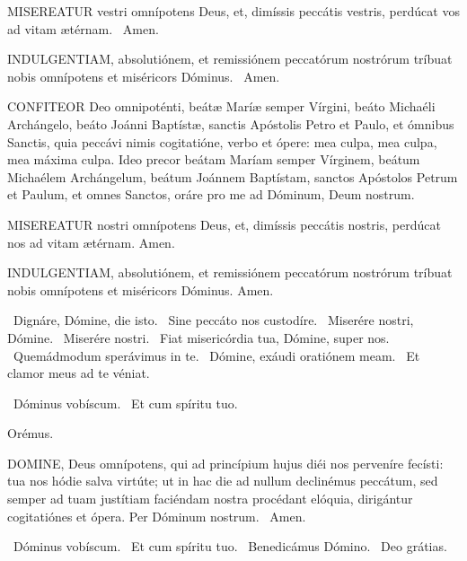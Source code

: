
\lettrine[lines=2]{M}{ISEREATUR} vestri omnípotens Deus, et, dimíssis peccátis vestris, perdúcat vos ad vitam ætérnam. \R\ Amen.

\lettrine[lines=2]{I}{NDULGENTIAM}, absolutiónem, et remissiónem peccatórum nostrórum tríbuat nobis omnípotens et miséricors Dóminus. \R\ Amen.


\lettrine[lines=2]{C}{ONFITEOR} Deo omnipoténti, beátæ Maríæ semper Vírgini, beáto Michaéli Archángelo, beáto Joánni Baptístæ, sanctis Apóstolis Petro et Paulo, et ómnibus Sanctis, quia peccávi nimis cogitatióne, verbo et ópere: mea culpa, mea culpa, mea máxima culpa. Ideo precor beátam Maríam semper Vírginem, beátum Michaélem Archángelum, beátum Joánnem Baptístam, sanctos Apóstolos Petrum et Paulum, et omnes Sanctos, oráre pro me ad Dóminum, Deum nostrum.


\lettrine[lines=2]{M}{ISEREATUR} nostri omnípotens Deus, et, dimíssis peccátis nostris, perdúcat nos ad vitam ætérnam. Amen.

\lettrine[lines=2]{I}{NDULGENTIAM}, absolutiónem, et remissiónem peccatórum nostrórum tríbuat nobis omnípotens et miséricors Dóminus. Amen.


\V\ Dignáre, Dómine, die isto. \R\ Sine peccáto nos custodíre. \V\ Miserére nostri, Dómine. \R\ Miserére nostri. \V\ Fiat misericórdia tua, Dómine, super nos. \R\ Quemádmodum sperávimus in te. \V\ Dómine, exáudi oratiónem meam. \R\ Et clamor meus ad te véniat.


\V\ Dóminus vobíscum. \R\ Et cum spíritu tuo.

Orémus. 

\lettrine[lines=2]{D}{OMINE}, Deus omnípotens, qui ad princípium hujus diéi nos perveníre fecísti: tua nos hódie salva virtúte; ut in hac die ad nullum declinémus peccátum, sed semper ad tuam justítiam faciéndam nostra procédant elóquia, dirigántur cogitatiónes et ópera. Per Dóminum nostrum. \R\ Amen.

\V\ Dóminus vobíscum. \R\ Et cum spíritu tuo. \V\ Benedicámus Dómino. \R\ Deo grátias.

